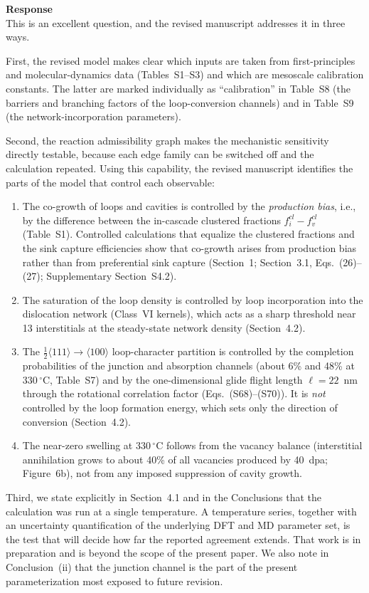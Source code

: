 \documentclass{article}
\newcommand{\hkl}[1]{\langle #1\rangle}
\newcommand{\half}{\tfrac{1}{2}}
\begin{document}
\begin{itemize}
\textbf{Response}\\
This is an excellent question, and the revised manuscript addresses it in three ways.

First, the revised model makes clear which inputs are taken from first-principles and molecular-dynamics data (Tables~S1--S3) and which are mesoscale calibration constants. The latter are marked individually as ``calibration'' in Table~S8 (the barriers and branching factors of the loop-conversion channels) and in Table~S9 (the network-incorporation parameters).

Second, the reaction admissibility graph makes the mechanistic sensitivity directly testable, because each edge family can be switched off and the calculation repeated. Using this capability, the revised manuscript identifies the parts of the model that control each observable:
\begin{enumerate}[label=(\roman*)]
    \item The co-growth of loops and cavities is controlled by the \emph{production bias}, i.e., by the difference between the in-cascade clustered fractions $f_i^{cl}-f_v^{cl}$ (Table~S1). Controlled calculations that equalize the clustered fractions and the sink capture efficiencies show that co-growth arises from production bias rather than from preferential sink capture (Section~1; Section~3.1, Eqs.~(26)--(27); Supplementary Section~S4.2).
    \item The saturation of the loop density is controlled by loop incorporation into the dislocation network (Class~VI kernels), which acts as a sharp threshold near 13 interstitials at the steady-state network density (Section~4.2).
    \item The $\half\hkl{111}\to\hkl{100}$ loop-character partition is controlled by the completion probabilities of the junction and absorption channels (about 6\% and 48\% at $330\,^\circ$C, Table~S7) and by the one-dimensional glide flight length $\ell = 22$~nm through the rotational correlation factor (Eqs.~(S68)--(S70)). It is \emph{not} controlled by the loop formation energy, which sets only the direction of conversion (Section~4.2).
    \item The near-zero swelling at $330\,^\circ$C follows from the vacancy balance (interstitial annihilation grows to about 40\% of all vacancies produced by 40~dpa; Figure~6b), not from any imposed suppression of cavity growth.
\end{enumerate}

Third, we state explicitly in Section~4.1 and in the Conclusions that the calculation was run at a single temperature. A temperature series, together with an uncertainty quantification of the underlying DFT and MD parameter set, is the test that will decide how far the reported agreement extends. That work is in preparation and is beyond the scope of the present paper. We also note in Conclusion~(ii) that the junction channel is the part of the present parameterization most exposed to future revision.


\end{itemize}
\end{document}
